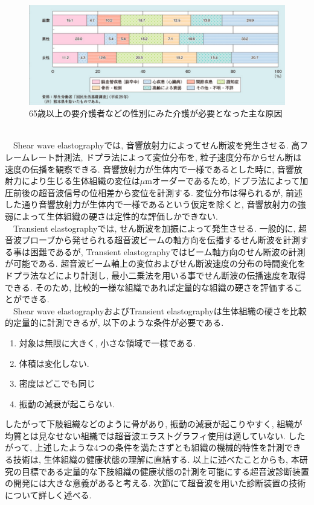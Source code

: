\begin{figure}[h]
  \begin{center}
    \includegraphics[width=140mm]{fig/kaigo.pdf}
  \end{center}
  \caption{65歳以上の要介護者などの性別にみた介護が必要となった主な原因\cite{kaigogenin}}
\end{figure}
\\\ \ Shear wave elastographyでは, 音響放射力によってせん断波を発生させる. 高フレームレート計測法, ドプラ法によって変位分布を, 粒子速度分布からせん断は速度の伝播を観察できる. 音響放射力が生体内で一様であるとした時に, 音響放射力により生じる生体組織の変位は$\mu$mオーダーであるため, ドプラ法によって加圧前後の超音波信号の位相差から変位を計測する\cite{elastographygenri}. 変位分布は得られるが, 前述した通り音響放射力が生体内で一様であるという仮定を除くと, 音響放射力の強弱によって生体組織の硬さは定性的な評価しかできない.
\\\ \ Transient elastographyでは, せん断波を加振によって発生させる. 一般的に, 超音波プローブから発せられる超音波ビームの軸方向を伝播するせん断波を計測する事は困難であるが, Transient elastographyではビーム軸方向のせん断波の計測が可能である. 超音波ビーム軸上の変位およびせん断波速度の分布の時間変化をドプラ法などにより計測し, 最小二乗法を用いる事でせん断波の伝播速度を取得できる. そのため, 比較的一様な組織であれば定量的な組織の硬さを評価することができる. 
\\\ \ Shear wave elastographyおよびTransient elastographyは生体組織の硬さを比較的定量的に計測できるが, 以下のような条件が必要である\cite{elastography1}.
\begin{enumerate}
   \item 対象は無限に大きく, 小さな領域で一様である.
   \item 体積は変化しない. 
   \item 密度はどこでも同じ
   \item 振動の減衰が起こらない. 
\end{enumerate}
したがって下肢組織などのように骨があり, 振動の減衰が起こりやすく, 組織が均質とは見なせない組織では超音波エラストグラフィ使用は適していない. したがって, 上述したような4つの条件を満たさずとも組織の機械的特性を計測できる技術は, 生体組織の健康状態の理解に直結する. 以上に述べたことからも, 本研究の目標である定量的な下肢組織の健康状態の計測を可能にする超音波診断装置の開発には大きな意義があると考える. 次節にて超音波を用いた診断装置の技術について詳しく述べる. 
